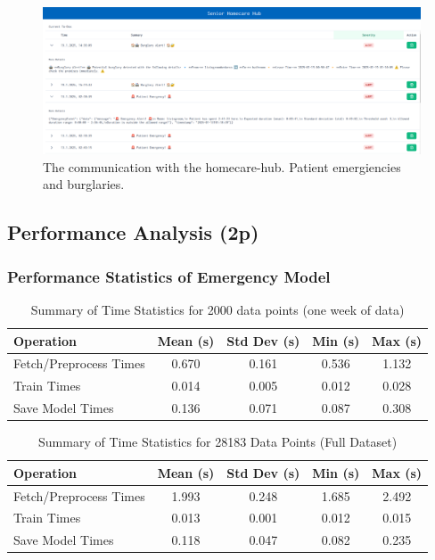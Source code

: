 \documentclass[A4,10pt]{article}
\begin{document}
\begin{figure}[H]
	\centering
	\includegraphics[width=1.1\textwidth]{homecare-hub02.png}
	\caption{The communication with the homecare-hub. Patient emergiencies and burglaries.}
	\label{fig:hub}
\end{figure}

\subsection{ Performance Analysis (2p)}

\subsubsection{Performance Statistics of Emergency Model}

\begin{table}[H]
\centering
\begin{tabular}{@{}lcccc@{}}
\toprule
\textbf{Operation} & \textbf{Mean (s)} & \textbf{Std Dev (s)} & \textbf{Min (s)} & \textbf{Max (s)} \\
\midrule
Fetch/Preprocess Times   & 0.670 & 0.161 & 0.536 & 1.132 \\
Train Times   & 0.014 & 0.005 & 0.012 & 0.028 \\
Save Model Times    & 0.136 & 0.071 & 0.087 & 0.308 \\
\bottomrule
\end{tabular}
\caption{Summary of Time Statistics for 2000 data points (one week of data)}
\label{tab:performance_stats}
\end{table}

\begin{table}[H]
\centering
\begin{tabular}{@{}lcccc@{}}
\toprule
\textbf{Operation} & \textbf{Mean (s)} & \textbf{Std Dev (s)} & \textbf{Min (s)} & \textbf{Max (s)} \\
\midrule
Fetch/Preprocess Times   & 1.993 & 0.248 & 1.685 & 2.492 \\
Train Times   & 0.013 & 0.001 & 0.012 & 0.015 \\
Save Model Times    & 0.118 & 0.047 & 0.082 & 0.235 \\
\bottomrule
\end{tabular}
\caption{Summary of Time Statistics for 28183 Data Points (Full Dataset)}
\label{tab:performance_stats_28183}
\end{table}
\end{document}
